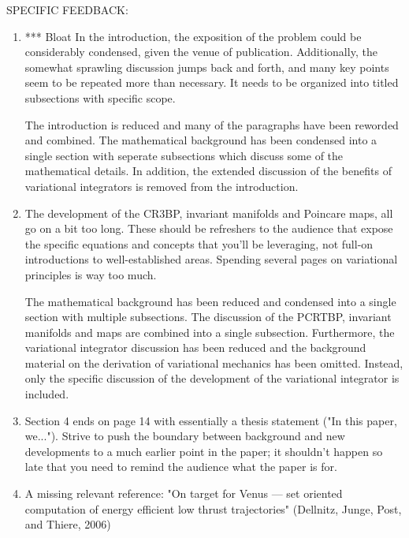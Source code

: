\documentclass[11pt]{article}
\begin{document}
SPECIFIC FEEDBACK:
\begin{enumerate}
    \item
    \begin{itshape}
*** Bloat
In the introduction, the exposition of the problem could be considerably condensed, given the venue of publication. Additionally, the somewhat sprawling discussion jumps back and forth, and many key points seem to be repeated more than necessary.  It needs to be organized into titled subsections with specific scope.
\end{itshape}

The introduction is reduced and many of the paragraphs have been reworded and combined. 
The mathematical background has been condensed into a single section with seperate subsections which discuss some of the mathematical details.
In addition, the extended discussion of the benefits of variational integrators is removed from the introduction.

\item
    \begin{itshape}
The development of the CR3BP, invariant manifolds and Poincare maps, all go on a bit too long. These should be refreshers to the audience that expose the specific equations and concepts that you'll be leveraging, not full-on introductions to well-established areas.  Spending several pages on variational principles is way too much.
\end{itshape}

The mathematical background has been reduced and condensed into a single section with multiple subsections.
The discussion of the PCRTBP, invariant manifolds and \Poincare maps are combined into a single subsection.
Furthermore, the variational integrator discussion has been reduced and the background material on the derivation of variational mechanics has been omitted.
Instead, only the specific discussion of the development of the variational integrator is included. 

\item
    \begin{itshape}
Section 4 ends on page 14 with essentially a thesis statement ("In this paper, we...").  Strive to push the boundary between background and new developments to a much earlier point in the paper; it shouldn't happen so late that you need to remind the audience what the paper is for.
\end{itshape}

\item 
    \begin{itshape}
A missing relevant reference: "On target for Venus — set oriented computation of energy efficient low thrust trajectories" (Dellnitz, Junge, Post, and Thiere, 2006)
\end{itshape}


\end{enumerate}
\end{document}

